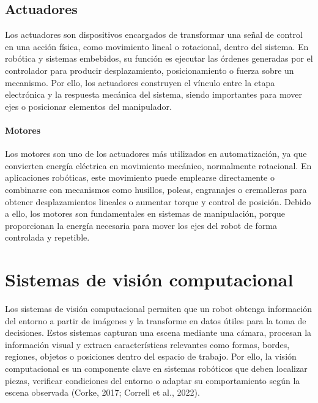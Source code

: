 \subsection{Actuadores}
Los actuadores son dispositivos encargados de transformar una señal de control en una acción física, como movimiento lineal o rotacional, dentro del sistema. En robótica y sistemas embebidos, su función es ejecutar las órdenes generadas por el controlador para producir desplazamiento, posicionamiento o fuerza sobre un mecanismo. Por ello, los actuadores construyen el vínculo entre la etapa electrónica y la respuesta mecánica del sistema, siendo importantes para mover ejes o posicionar elementos del manipulador.

\paragraph{Motores}
Los motores son uno de los actuadores más utilizados en automatización, ya que convierten energía eléctrica en movimiento mecánico, normalmente rotacional. En aplicaciones robóticas, este movimiento puede emplearse directamente o combinarse con mecanismos como husillos, poleas, engranajes o cremalleras para obtener desplazamientos lineales o aumentar torque y control de posición. Debido a ello, los motores son fundamentales en sistemas de manipulación, porque proporcionan la energía necesaria para mover los ejes del robot de forma controlada y repetible.

\section{Sistemas de visión computacional}
Los sistemas de visión computacional permiten que un robot obtenga información del entorno a partir de imágenes y la transforme en datos útiles para la toma de decisiones. Estos sistemas capturan una escena mediante una cámara, procesan la información visual y extraen características relevantes como formas, bordes, regiones, objetos o posiciones dentro del espacio de trabajo. Por ello, la visión computacional es un componente clave en sistemas robóticos que deben localizar piezas, verificar condiciones del entorno o adaptar su comportamiento según la escena observada (Corke, 2017; Correll et al., 2022).

